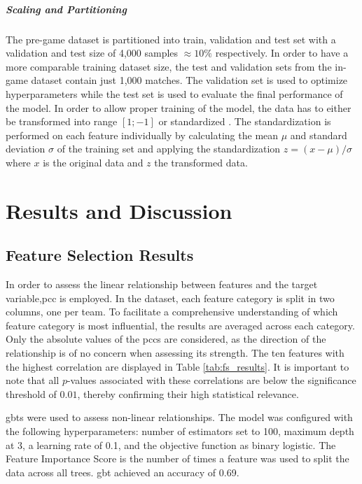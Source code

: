 \documentclass[12pt, a4paper, headinclude, twoside, plainheadsepline, open=right, numbers=noenddot, hidelinks, toc=listof, toc=bibliography]{scrreprt}
\begin{document}
\paragraph{Scaling and Partitioning}
The pre-game dataset is partitioned into train, validation and test set with a validation and test size of 4,000 samples $ \approx 10\%$ respectively.
In order to have a more comparable training dataset size, the test and validation sets from the in-game dataset contain just 1,000 matches.
The validation set is used to optimize hyperparameters while the test set is used to evaluate the final performance of the model.
In order to allow proper training of the model, the data has to either be transformed into range $[1;-1]$ or standardized \cite{shankerEffectDataStandardization1996}.
The standardization is performed on each feature individually by calculating the mean $\mu$ and standard deviation $\sigma$ of the training set and applying the standardization $z = (x - \mu) / \sigma$ where $x$ is the original data and $z$ the transformed data.

\chapter{Results and Discussion}
\label{chap:results}

\section{Feature Selection Results}
\label{sec:feature_selection_results}

In order to assess the linear relationship between features and the target variable,\acl{pcc} is employed.
In the dataset, each feature category is split in two columns, one per team.
To facilitate a comprehensive understanding of which feature category is most influential, the results are averaged across each category.
Only the absolute values of the \acp{pcc} are considered, as the direction of the relationship is of no concern when assessing its strength.
The ten features with the highest correlation are displayed in Table \ref{tab:fs_results}.
It is important to note that all $p$-values associated with these correlations are below the significance threshold of $0.01$, thereby confirming their high statistical relevance.

\Aclp{gbt} were used to assess non-linear relationships.
The model was configured with the following hyperparameters: number of estimators set to 100, maximum depth at 3, a learning rate of 0.1, and the objective function as binary logistic.
The Feature Importance Score is the number of times a feature was used to split the data across all trees.
\Ac{gbt} achieved an accuracy of 0.69.
\end{document}
